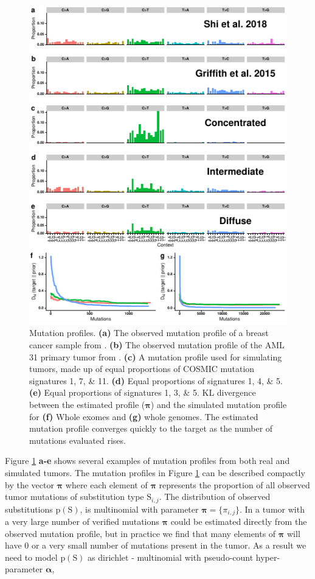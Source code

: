\documentclass[a4,center,fleqn]{NAR}
\begin{document}
\begin{figure}[t]
  \begin{center}
  \includegraphics{figures/signature_figure.pdf}
  \end{center}
  \caption{Mutation profiles. 
  \textbf{(a)} The observed mutation profile of a breast cancer sample from \cite{Shi2018}.
  \textbf{(b)} The observed mutation profile of the AML 31 primary tumor from \cite{Griffith2015}.
  \textbf{(c)} A mutation profile used for simulating tumors, made up of equal proportions of COSMIC mutation signatures 1, 7, \& 11.
  \textbf{(d)} Equal proportions of signatures 1, 4, \& 5.
  \textbf{(e)} Equal proportions of signatures 1, 3, \& 5.
  KL divergence between the estimated profile ($\boldsymbol{\pi}$) and the simulated mutation profile for \textbf{(f)} Whole exomes and \textbf{(g)} whole genomes.
  The estimated mutation profile converges quickly to the target as the number of mutations evaluated rises.
  }
  \label{NAR-sigfig}
  \end{figure}

Figure \ref{NAR-sigfig} \textbf{a-e} shows several examples of mutation profiles from both real and simulated tumors.
The mutation profiles in Figure \ref{NAR-sigfig} can be described compactly by the vector $\boldsymbol{\pi}$ where each element of $\boldsymbol{\pi}$ represents the proportion of all observed tumor mutations of substitution type $\mathrm{S}_{i,j}$.
The distribution of observed substitutions $ \mathrm{p}(\mathrm{S}) $, is multinomial with parameter $ \boldsymbol{ \pi } = \{\pi_{i,j}\} $.
In a tumor with a very large number of verified mutations $\boldsymbol{\pi}$ could be estimated directly from the observed mutation profile, but in practice we find that many elements of $\boldsymbol{\pi}$ will have $0$ or a very small number of mutations present in the tumor.
As a result we need to model $\mathrm{p}(\mathrm{S})$ as dirichlet - multinomial with pseudo-count hyper-parameter $\boldsymbol{\alpha}$, 
\end{document}
